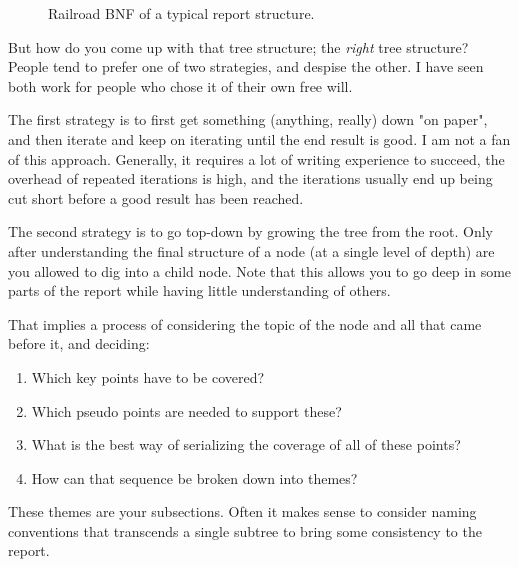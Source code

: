 \documentclass[a4paper, oneside]{memoir}
\begin{document}
\begin{figure}
\begin{adjustbox}{trim=2.4cm 0 0 0mm}
{
      }
    \end{adjustbox}
  \caption{\label{fig:firststeps:process:bnf} Railroad BNF of a typical report structure.}
\end{figure}

But how do you come up with that tree structure; the \textsl{right} tree structure? People tend to prefer one of two strategies, and despise the other. I have seen both work for people who chose it of their own free will.

The first strategy is to first get something (anything, really) down "on paper", and then iterate and keep on iterating until the end result is good. I am not a fan of this approach. Generally, it requires a lot of writing experience to succeed, the overhead of repeated iterations is high, and the iterations usually end up being cut short before a good result has been reached.

The second strategy is to go top-down by growing the tree from the root. Only after understanding the final structure of a node (at a single level of depth) are you allowed to dig into a child node. Note that this allows you to go deep in some parts of the report while having little understanding of others.

That implies a process of considering the topic of the node and all that came before it, and deciding:
\begin{enumerate}
  \item Which key points have to be covered?
  \item Which pseudo points are needed to support these?
  \item What is the best way of serializing the coverage of all of these points?
  \item How can that sequence be broken down into themes?
\end{enumerate}
These themes are your subsections. Often it makes sense to consider naming conventions that transcends a single subtree to bring some consistency to the report.
\end{document}
